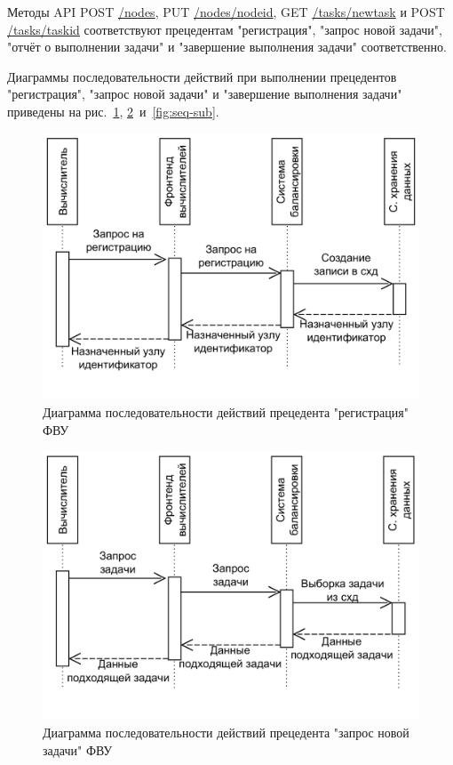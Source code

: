 \documentclass[a4paper,12pt]{report}
\numberwithin{equation}{section}
\begin{document}
  Методы API POST \url{/nodes}, PUT \url{/nodes/nodeid}, GET \url{/tasks/newtask} и POST \url{/tasks/taskid} соответствуют прецедентам "регистрация", "запрос новой задачи", "отчёт о выполнении задачи" и "завершение выполнения задачи" соответственно.
  
  Диаграммы последовательности действий при выполнении прецедентов "регистрация", "запрос новой задачи" и "завершение выполнения задачи" приведены на рис.~\ref{fig:seq-reg}, \ref{fig:seq-req}~и~\ref{fig:seq-sub}.
  
  \begin{figure}
    \centering
    \includegraphics[width=.7\linewidth]{diagrams/frontnode/seq-register}
    \caption{Диаграмма последовательности действий прецедента "регистрация" ФВУ}
    \label{fig:seq-reg}
  \end{figure}
  
  \begin{figure}
    \centering
    \includegraphics[width=.7\linewidth]{diagrams/frontnode/seq-request}
    \caption{Диаграмма последовательности действий прецедента "запрос новой задачи" ФВУ}
    \label{fig:seq-req}
  \end{figure}
  
\end{document}
